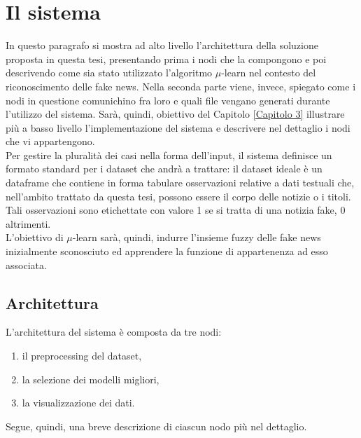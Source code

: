 \documentclass[12pt]{report}
\theoremstyle{definition}
\begin{document}
\section{Il sistema}
\label{sistema}
In questo paragrafo si mostra ad alto livello l'architettura della soluzione proposta in questa tesi, presentando prima i nodi che la compongono e poi descrivendo come sia stato utilizzato l'algoritmo $\mu$-learn nel contesto del riconoscimento delle fake news.
Nella seconda parte viene, invece, spiegato come i nodi in questione comunichino fra loro e quali file vengano generati durante l'utilizzo del sistema. Sarà, quindi, obiettivo del Capitolo \ref{Capitolo 3} illustrare più a basso livello l'implementazione del sistema e descrivere nel dettaglio i nodi che vi appartengono.
\\
Per gestire la pluralità dei casi nella forma dell'input, il sistema definisce un formato standard per i dataset che andrà a trattare: il dataset ideale è un dataframe che contiene in forma tabulare osservazioni relative a dati testuali che, nell'ambito trattato da questa tesi, possono essere il corpo delle notizie o i titoli.
Tali osservazioni sono etichettate con valore 1 se si tratta di una notizia fake, 0 altrimenti.
\\
L'obiettivo di $\mu$-learn sarà, quindi, indurre l'insieme fuzzy delle fake news inizialmente sconosciuto ed apprendere la funzione di appartenenza ad esso associata.
\subsection{Architettura}\label{architecture}
L'architettura del sistema è composta da tre nodi: 
\begin{enumerate}
    \item il preprocessing del dataset,
    \item la selezione dei modelli migliori,
    \item la visualizzazione dei dati.
\end{enumerate}
Segue, quindi, una breve descrizione di ciascun nodo più nel dettaglio.
\end{document}
